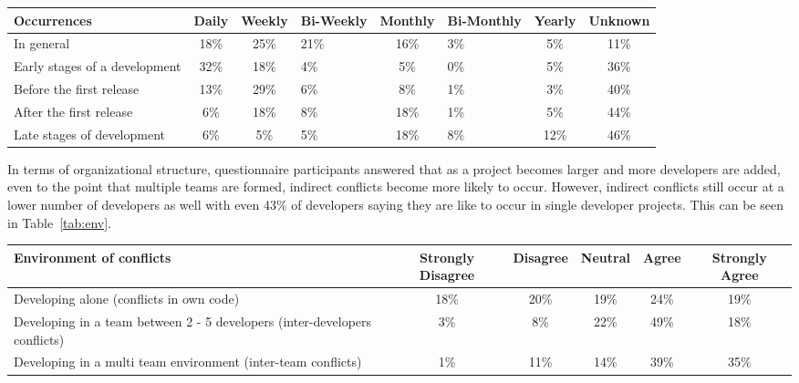 \begin{table*}[tb!]
\begin{center}
\begin{tabular}{| p{2cm} | c | c | p{1.2cm} | c | p{1.3cm} | c | c |}
\hline
Occurrences & Daily & Weekly & Bi-Weekly & Monthly & Bi-Monthly & Yearly & Unknown \\
\hline
\hline
In general & 18\% & 25\% & 21\% & 16\% & 3\% & 5\% & 11\% \\ \hline
Early stages of a development & 32\% & 18\% & 4\% & 5\% & 0\% & 5\% & 36\% \\ \hline
Before the first release & 13\% & 29\% & 6\% & 8\% & 1\% & 3\% & 40\% \\ \hline
After the first release & 6\% & 18\% & 8\% & 18\% & 1\% & 5\% & 44\% \\ \hline
Late stages of development & 6\% & 5\% & 5\% & 18\% & 8\% & 12\% & 46\% \\ \hline
\end{tabular}
\end{center}
\caption{Results of questionnaire as to how often indirect conflicts occur, in terms of percentage
of questionnaire participants.\label{tab:often}}
\end{table*}

In terms of organizational structure, questionnaire participants answered that as a project becomes larger and more
developers are added, even to the point that multiple teams are formed, indirect conflicts become more likely to
occur. However, indirect conflicts still occur at a lower number of developers as well with even 43\% of developers
saying they are like to occur in single developer projects. This can be seen in Table~\ref{tab:env}.

\begin{table*}[tb!]
\begin{center}
\begin{tabular}{| p{3cm} | c | c | c | c | c |}
\hline
Environment of conflicts & Strongly Disagree & Disagree & Neutral & Agree & Strongly Agree \\
\hline
\hline
Developing alone (conflicts in own code) & 18\% & 20\% & 19\% & 24\% & 19\% \\ \hline
Developing in a team between 2 - 5 developers (inter-developers conflicts) & 3\% & 8\% & 22\% & 49\% & 18\% \\ \hline
Developing in a multi team environment (inter-team conflicts) & 1\% & 11\% & 14\% & 39\% & 35\% \\ \hline
\end{tabular}
\end{center}
\caption{Questionnaire results about development environments in which indirect conflicts are likely to occur, in terms of percentage
of questionnaire participants.\label{tab:env}}
\end{table*}

